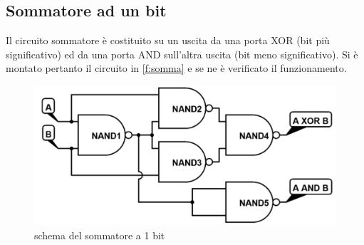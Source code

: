 \subsection{Sommatore ad un bit}	
Il circuito sommatore è costituito su un uscita da una porta XOR (bit più significativo) ed da una porta AND sull'altra uscita (bit meno significativo). Si è montato pertanto il circuito in \figurename{ \ref{f:somma}} e se ne è verificato il funzionamento.
\begin{figure}[H]
	\centering
	\includegraphics[scale=0.3]{../Figs-Tabs/SUM_.png}
	\caption{schema del sommatore a 1 bit}
\end{figure}\label{f:somma}

